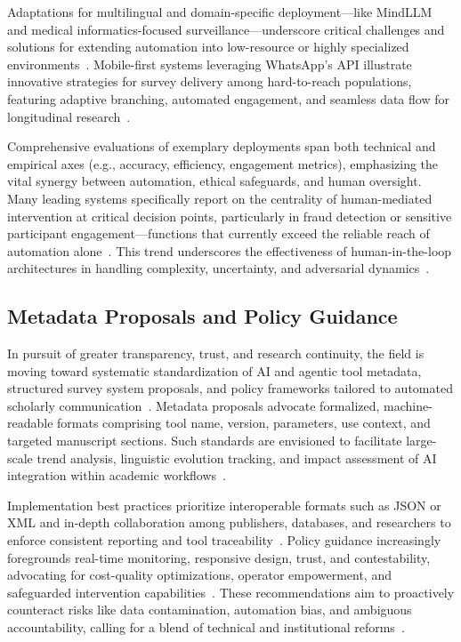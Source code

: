 Adaptations for multilingual and domain-specific deployment—like MindLLM and medical informatics-focused surveillance—underscore critical challenges and solutions for extending automation into low-resource or highly specialized environments~\cite{ref92,ref94,ref95,ref100}. Mobile-first systems leveraging WhatsApp’s API illustrate innovative strategies for survey delivery among hard-to-reach populations, featuring adaptive branching, automated engagement, and seamless data flow for longitudinal research~\cite{ref104,ref112,ref113,ref114,ref115,ref117}.

Comprehensive evaluations of exemplary deployments span both technical and empirical axes (e.g., accuracy, efficiency, engagement metrics), emphasizing the vital synergy between automation, ethical safeguards, and human oversight. Many leading systems specifically report on the centrality of human-mediated intervention at critical decision points, particularly in fraud detection or sensitive participant engagement—functions that currently exceed the reliable reach of automation alone~\cite{ref93,ref112,ref113,ref114,ref115,ref117}. This trend underscores the effectiveness of human-in-the-loop architectures in handling complexity, uncertainty, and adversarial dynamics~\cite{ref85,ref86,ref91,ref94,ref95,ref117}.

\subsection{Metadata Proposals and Policy Guidance}

In pursuit of greater transparency, trust, and research continuity, the field is moving toward systematic standardization of AI and agentic tool metadata, structured survey system proposals, and policy frameworks tailored to automated scholarly communication~\cite{ref106}\cite{ref111}\cite{ref117}. Metadata proposals advocate formalized, machine-readable formats comprising tool name, version, parameters, use context, and targeted manuscript sections. Such standards are envisioned to facilitate large-scale trend analysis, linguistic evolution tracking, and impact assessment of AI integration within academic workflows~\cite{ref106}.

Implementation best practices prioritize interoperable formats such as JSON or XML and in-depth collaboration among publishers, databases, and researchers to enforce consistent reporting and tool traceability~\cite{ref106}\cite{ref117}. Policy guidance increasingly foregrounds real-time monitoring, responsive design, trust, and contestability, advocating for cost-quality optimizations, operator empowerment, and safeguarded intervention capabilities~\cite{ref111}. These recommendations aim to proactively counteract risks like data contamination, automation bias, and ambiguous accountability, calling for a blend of technical and institutional reforms~\cite{ref111}\cite{ref117}.

